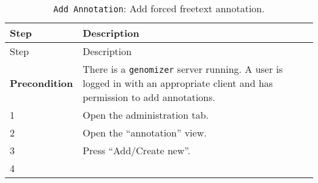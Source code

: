 \begin{longtable}[c]{@{}ll@{}}
\caption{\texttt{Add\ Annotation}: Add forced freetext
annotation.}\tabularnewline
\toprule
\begin{minipage}[b]{0.31\columnwidth}\raggedright\strut
Step
\strut\end{minipage} &
\begin{minipage}[b]{0.63\columnwidth}\raggedright\strut
Description
\strut\end{minipage}\tabularnewline
\midrule
\endfirsthead
\toprule
\begin{minipage}[b]{0.31\columnwidth}\raggedright\strut
Step
\strut\end{minipage} &
\begin{minipage}[b]{0.63\columnwidth}\raggedright\strut
Description
\strut\end{minipage}\tabularnewline
\midrule
\endhead
\begin{minipage}[t]{0.31\columnwidth}\raggedright\strut
\textbf{Precondition}
\strut\end{minipage} &
\begin{minipage}[t]{0.63\columnwidth}\raggedright\strut
There is a \texttt{genomizer} server running. A user is logged in with
an appropriate client and has permission to add annotations.
\strut\end{minipage}\tabularnewline
\begin{minipage}[t]{0.31\columnwidth}\raggedright\strut
1
\strut\end{minipage} &
\begin{minipage}[t]{0.63\columnwidth}\raggedright\strut
Open the administration tab.
\strut\end{minipage}\tabularnewline
\begin{minipage}[t]{0.31\columnwidth}\raggedright\strut
2
\strut\end{minipage} &
\begin{minipage}[t]{0.63\columnwidth}\raggedright\strut
Open the ``annotation'' view.
\strut\end{minipage}\tabularnewline
\begin{minipage}[t]{0.31\columnwidth}\raggedright\strut
3
\strut\end{minipage} &
\begin{minipage}[t]{0.63\columnwidth}\raggedright\strut
Press ``Add/Create new''.
\strut\end{minipage}\tabularnewline
\begin{minipage}[t]{0.31\columnwidth}\raggedright\strut
4
\strut\end{minipage} &

\end{longtable}
